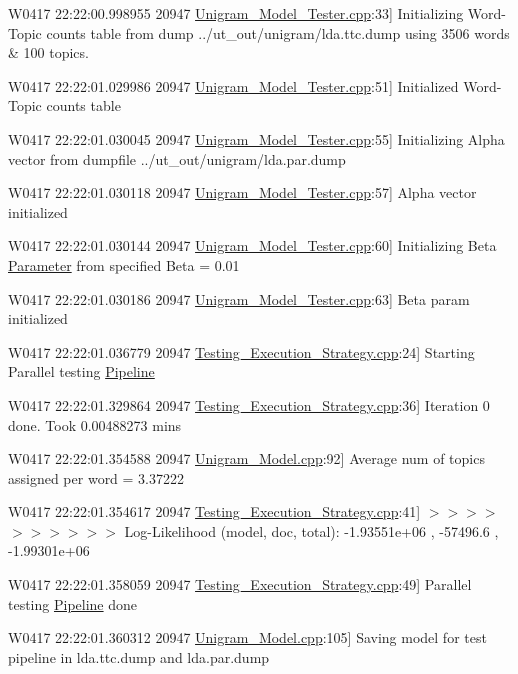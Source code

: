 {\ttfamily W0417 22:22:00.998955 20947 \hyperlink{_unigram___model___tester_8cpp}{Unigram\_\-Model\_\-Tester.cpp}:33\mbox{]} Initializing Word-\/Topic counts table from dump ../ut\_\-out/unigram/lda.ttc.dump using 3506 words \& 100 topics.  }

{\ttfamily W0417 22:22:01.029986 20947 \hyperlink{_unigram___model___tester_8cpp}{Unigram\_\-Model\_\-Tester.cpp}:51\mbox{]} Initialized Word-\/Topic counts table  }

{\ttfamily W0417 22:22:01.030045 20947 \hyperlink{_unigram___model___tester_8cpp}{Unigram\_\-Model\_\-Tester.cpp}:55\mbox{]} Initializing Alpha vector from dumpfile ../ut\_\-out/unigram/lda.par.dump  }

{\ttfamily W0417 22:22:01.030118 20947 \hyperlink{_unigram___model___tester_8cpp}{Unigram\_\-Model\_\-Tester.cpp}:57\mbox{]} Alpha vector initialized  }

{\ttfamily W0417 22:22:01.030144 20947 \hyperlink{_unigram___model___tester_8cpp}{Unigram\_\-Model\_\-Tester.cpp}:60\mbox{]} Initializing Beta \hyperlink{struct_parameter}{Parameter} from specified Beta = 0.01  }

{\ttfamily W0417 22:22:01.030186 20947 \hyperlink{_unigram___model___tester_8cpp}{Unigram\_\-Model\_\-Tester.cpp}:63\mbox{]} Beta param initialized  }

{\ttfamily W0417 22:22:01.036779 20947 \hyperlink{_testing___execution___strategy_8cpp}{Testing\_\-Execution\_\-Strategy.cpp}:24\mbox{]} Starting Parallel testing \hyperlink{class_pipeline}{Pipeline}  }

{\ttfamily W0417 22:22:01.329864 20947 \hyperlink{_testing___execution___strategy_8cpp}{Testing\_\-Execution\_\-Strategy.cpp}:36\mbox{]} Iteration 0 done. Took 0.00488273 mins  }

{\ttfamily W0417 22:22:01.354588 20947 \hyperlink{_unigram___model_8cpp}{Unigram\_\-Model.cpp}:92\mbox{]} Average num of topics assigned per word = 3.37222  }

{\ttfamily W0417 22:22:01.354617 20947 \hyperlink{_testing___execution___strategy_8cpp}{Testing\_\-Execution\_\-Strategy.cpp}:41\mbox{]} $>$$>$$>$$>$$>$$>$$>$$>$$>$$>$ Log-\/Likelihood (model, doc, total): -\/1.93551e+06 , -\/57496.6 , -\/1.99301e+06  }

{\ttfamily W0417 22:22:01.358059 20947 \hyperlink{_testing___execution___strategy_8cpp}{Testing\_\-Execution\_\-Strategy.cpp}:49\mbox{]} Parallel testing \hyperlink{class_pipeline}{Pipeline} done  }

{\ttfamily W0417 22:22:01.360312 20947 \hyperlink{_unigram___model_8cpp}{Unigram\_\-Model.cpp}:105\mbox{]} Saving model for test pipeline in lda.ttc.dump and lda.par.dump  }

